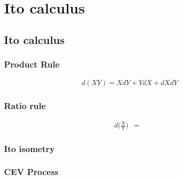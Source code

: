 \chapter{Ito calculus}

\section{Ito calculus}

\subsection{Product Rule}

\begin{eqnarray}
d(XY) = XdY + YdX +dX dY
\end{eqnarray}

\subsection{Ratio rule}
\begin{eqnarray}
d\bigg(\frac{X}{Y}\bigg) &=& 
\end{eqnarray}

\subsection{Ito isometry}

\subsection{CEV Process}
